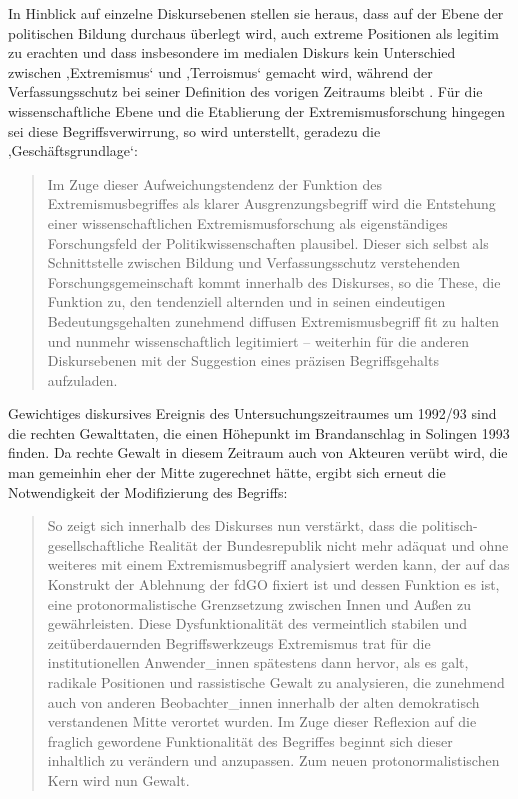 In Hinblick auf einzelne Diskursebenen stellen sie heraus, dass auf der Ebene der politischen Bildung durchaus überlegt wird, auch extreme Positionen als legitim zu erachten und dass insbesondere im medialen Diskurs kein Unterschied zwischen ‚Extremismus` und ‚Terroismus` gemacht wird, während der Verfassungsschutz bei seiner Definition des vorigen Zeitraums bleibt \autocite[163]{ackermannMetamorphosenExtremismusbegriffesDiskursanalytische2015}. Für die wissenschaftliche Ebene und die Etablierung der Extremismusforschung hingegen sei diese Begriffsverwirrung, so wird unterstellt, geradezu die ‚Geschäftsgrundlage`:

\begin{quote}
Im Zuge dieser Aufweichungstendenz der Funktion des Extremismusbegriffes als klarer Ausgrenzungsbegriff wird die Entstehung einer wissenschaftlichen Extremismusforschung als eigenständiges Forschungsfeld der Politikwissenschaften plausibel. Dieser sich selbst als Schnittstelle zwischen Bildung und Verfassungsschutz verstehenden Forschungsgemeinschaft kommt innerhalb des Diskurses, so die These, die Funktion zu, den tendenziell alternden und in seinen eindeutigen Bedeutungsgehalten zunehmend diffusen Extremismusbegriff fit zu halten und nunmehr wissenschaftlich legitimiert -- weiterhin für die anderen Diskursebenen mit der Suggestion eines präzisen Begriffsgehalts aufzuladen. \autocite[163]{ackermannMetamorphosenExtremismusbegriffesDiskursanalytische2015}
\end{quote}

Gewichtiges diskursives Ereignis des Untersuchungszeitraumes um 1992{\slash}93 sind die rechten Gewalttaten, die einen Höhepunkt im Brandanschlag in Solingen 1993 finden. Da rechte Gewalt in diesem Zeitraum auch von Akteuren verübt wird, die man gemeinhin eher der Mitte zugerechnet hätte, ergibt sich erneut die Notwendigkeit der Modifizierung des Begriffs:

\begin{quote}
So zeigt sich innerhalb des Diskurses nun verstärkt, dass die politisch-gesellschaftliche Realität der Bundesrepublik nicht mehr adäquat und ohne weiteres mit einem Extremismusbegriff analysiert werden kann, der auf das Konstrukt der Ablehnung der fdGO fixiert ist und dessen Funktion es ist, eine protonormalistische Grenzsetzung zwischen Innen und Außen zu gewährleisten. Diese Dysfunktionalität des vermeintlich stabilen und zeitüberdauernden Begriffswerkzeugs Extremismus trat für die institutionellen Anwender\_innen spätestens dann hervor, als es galt, radikale Positionen und rassistische Gewalt zu analysieren, die zunehmend auch von anderen Beobachter\_innen innerhalb der alten demokratisch verstandenen Mitte verortet wurden. Im Zuge dieser Reflexion auf die fraglich gewordene Funktionalität des Begriffes beginnt sich dieser inhaltlich zu verändern und anzupassen. Zum neuen protonormalistischen Kern wird nun Gewalt. \autocite[189-190]{ackermannMetamorphosenExtremismusbegriffesDiskursanalytische2015}
\end{quote}

